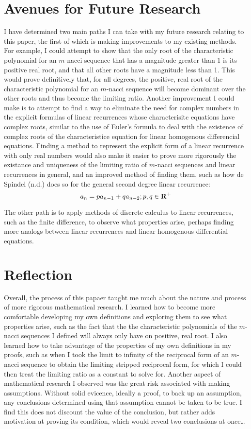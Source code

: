 \documentclass[11pt]{article}
\begin{document}
\section{Avenues for Future Research}
    I have determined two main paths I can take with my future research relating to this paper, the first of which is making improvements to my existing methods. For example, I could attempt to show that the only root of the characteristic polynomial for an \(m\)-nacci sequence that has a magnitude greater than 1 is its positive real root, and that all other roots have a magnitude less than 1. This would prove definitively that, for all degrees, the positive, real root of the characteristic polynomial for an \(m\)-nacci sequence will become dominant over the other roots and thus become the limiting ratio. 
Another improvement I could make is to attempt to find a way to eliminate the need for complex numbers in the explicit formulas of linear recurrences whose characterisitc equations have complex roots, similar to the use of Euler's formula to deal with the existence of complex roots of the characteristice equation for linear homogenous differencial equations. 
Finding a method to represent the explicit form of a linear recurrence with only real numbers would also make it easier to prove more rigorously the existance and uniqueness of the limiting ratio of \(m\)-nacci sequences and linear recurrences in general, and an improved method of finding them, such as how de Spindel (n.d.) does so for the general second degree linear recurrence:
\[a_n=pa_{n-1}+qa_{n-2}; p,q\in\mbox{\textbf{R}}^+\]

The other path is to apply methods of discrete calculus to linear recurrences, such as the finite difference, to observe what properties arise, perhaps finding more analogs between linear recurrences and linear homogenous differential equations.

\section{Reflection}
Overall, the process of this papaer taught me much about the nature and process of more rigorous mathematical research. I learned how to become more comfortable developing my own definitions and exploring them to see what properties arise, such as the fact that the the characteristic polynomials of the \(m\)-nacci sequences I defined will always only have on positive, real root. I also learned how to take advantage of the properties of my own definitions in my proofs, such as when I took the limit to infinity of the reciprocal form of an \(m\)-nacci sequence to obtain the limiting stripped reciprocal form, for which I could then treat the limiting ratio as a constant to solve for. 
Another aspect of mathematical research I observed was the great risk associated with making assumptions. Without solid evicence, ideally a proof, to back up an assumption, any conclusions determined using that assumption cannot be taken to be true. I find this does not discount the value of the conclusion, but rather adds motivation at proving its condition, which would reveal two conclusions at once\dots
\end{document}

